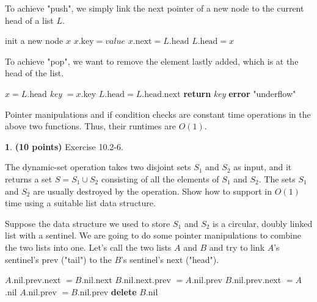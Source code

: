 \documentclass[11pt]{article}
\theoremstyle{definition}
\theoremstyle{theorem}
\newtheorem{prob}{}
\newcommand{\solution}{\medskip\noindent{\color{DarkBlue}\textbf{Solution:}}}
\begin{document}
\solution

To achieve "push", we simply link the next pointer of a new node to the current head of a list $L$.

\begin{algorithmic}[1]
	\State init a new node $x$
	\State $x.\text{key} = \textit{value}$
	\State $x.\text{next} = L.\text{head}$
	\State $L.\text{head} = x$
\EndFunction
\end{algorithmic}


To achieve "pop", we want to remove the element lastly added, which is at the head of the list. 

\begin{algorithmic}[1]
	\State $x = L.\text{head}$
		\State \textit{key} $= x$.key
		\State $L.\text{head} = L.\text{head}.\text{next}$
		\State \textbf{return} \textit{key}
	\Else
		\State \textbf{error} "underflow"
	\EndIf
\EndFunction
\end{algorithmic}

Pointer manipulations and if condition checks are constant time operations in the above two functions. Thus, their runtimes are $O(1)$.


\newpage
\begin{prob} \textbf{(10 points)} Exercise 10.2-6.
\end{prob}

The dynamic-set operation  takes two disjoint sets $S_1$ and $S_2$ as input, and it returns a set $S = S_1 \cup S_2$ consisting of all the elements of $S_1$ and $S
_2$. The sets $S_1$ and $S_2$ are usually destroyed by the operation. Show how to support  in $O(1)$ time using a suitable list data structure.

\solution

Suppose the data structure we used to store $S_1$ and $S_2$ is a circular, doubly linked list with a sentinel. We are going to do some pointer manipulations to combine the two lists into one. Let's call the two lists $A$ and $B$ and try to link $A$'s sentinel's prev ("tail") to the $B$'s sentinel's next ("head").

\begin{algorithmic}[1]
	\State $A$.nil.prev.next $ = B$.nil.next	
	\State $B$.nil.next.prev $ = A$.nil.prev
	\State $B$.nil.prev.next $ = A$.nil		
	\State $A$.nil.prev $ = B$.nil.prev
	\State \textbf{delete} $B$.nil				
\EndFunction
\end{algorithmic}
\end{document}
